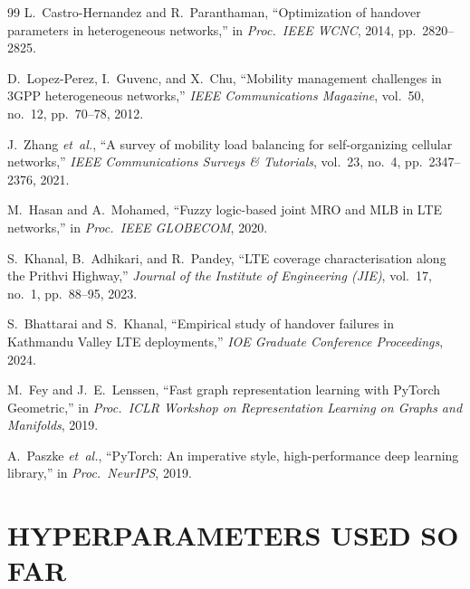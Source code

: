 \documentclass[12pt,a4paper,oneside]{report}
\begin{document}
\begin{thebibliography}{99}
 L.~Castro-Hernandez and R.~Paranthaman,
``Optimization of handover parameters in heterogeneous networks,''
in \textit{Proc.\ IEEE WCNC}, 2014, pp.~2820--2825.

 D.~Lopez-Perez, I.~Guvenc, and
X.~Chu, ``Mobility management challenges in 3GPP heterogeneous
networks,'' \textit{IEEE Communications Magazine}, vol.~50, no.~12,
pp.~70--78, 2012.

 J.~Zhang \textit{et~al.}, ``A survey of
mobility load balancing for self-organizing cellular networks,''
\textit{IEEE Communications Surveys \& Tutorials}, vol.~23, no.~4,
pp.~2347--2376, 2021.

 M.~Hasan and A.~Mohamed, ``Fuzzy logic-based
joint MRO and MLB in LTE networks,'' in \textit{Proc.\ IEEE GLOBECOM},
2020.

 S.~Khanal, B.~Adhikari, and R.~Pandey, ``LTE
coverage characterisation along the Prithvi Highway,'' \textit{Journal
of the Institute of Engineering (JIE)}, vol.~17, no.~1, pp.~88--95,
2023.

 S.~Bhattarai and S.~Khanal, ``Empirical
study of handover failures in Kathmandu Valley LTE deployments,''
\textit{IOE Graduate Conference Proceedings}, 2024.

 M.~Fey and J.~E.~Lenssen, ``Fast graph
representation learning with PyTorch Geometric,'' in \textit{Proc.\
ICLR Workshop on Representation Learning on Graphs and Manifolds},
2019.

 A.~Paszke \textit{et~al.}, ``PyTorch: An
imperative style, high-performance deep learning library,'' in
\textit{Proc.\ NeurIPS}, 2019.

\end{thebibliography}

\appendix

\chapter{HYPERPARAMETERS USED SO FAR}
\end{document}
